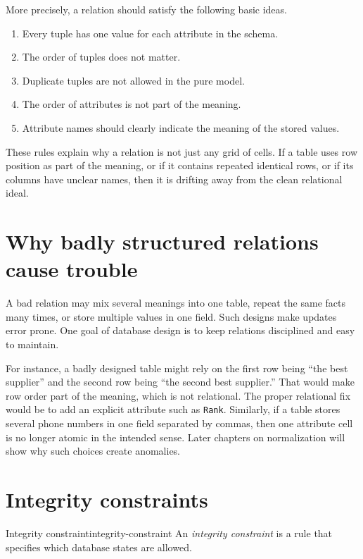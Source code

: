 \documentclass[11pt,a4paper,openany]{book}
\begin{document}
More precisely, a relation should satisfy the following basic ideas.

\begin{enumerate}
\item Every tuple has one value for each attribute in the schema.
\item The order of tuples does not matter.
\item Duplicate tuples are not allowed in the pure model.
\item The order of attributes is not part of the meaning.
\item Attribute names should clearly indicate the meaning of the stored values.
\end{enumerate}

These rules explain why a relation is not just any grid of cells. If a table uses row position as part of the meaning, or if it contains repeated identical rows, or if its columns have unclear names, then it is drifting away from the clean relational ideal.

\section{Why badly structured relations cause trouble}
A bad relation may mix several meanings into one table, repeat the same facts many times, or store multiple values in one field. Such designs make updates error prone. One goal of database design is to keep relations disciplined and easy to maintain.

For instance, a badly designed table might rely on the first row being ``the best supplier'' and the second row being ``the second best supplier.'' That would make row order part of the meaning, which is not relational. The proper relational fix would be to add an explicit attribute such as \texttt{Rank}. Similarly, if a table stores several phone numbers in one field separated by commas, then one attribute cell is no longer atomic in the intended sense. Later chapters on normalization will show why such choices create anomalies.

\section{Integrity constraints}
\begin{definition}{Integrity constraint}{integrity-constraint}
An \emph{integrity constraint} is a rule that specifies which database states are allowed.
\end{definition}
\end{document}
